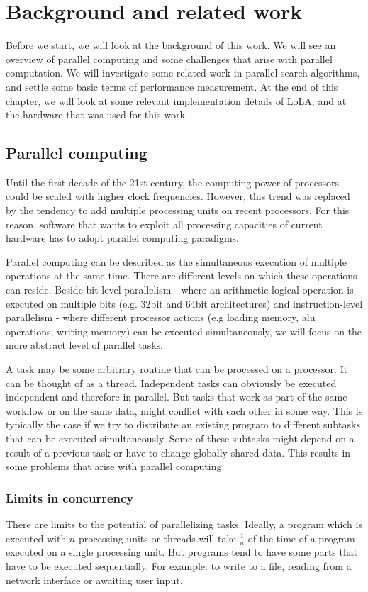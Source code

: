 \chapter{Background and related work}
Before we start, we will look at the background of this work. We will see an overview of parallel computing and some challenges that arise with parallel computation. We will investigate some related work in parallel search algorithms, and settle some basic terms of performance measurement. At the end of this chapter, we will look at some relevant implementation details of LoLA, and at the hardware that was used for this work.

\section{Parallel computing}
Until the first decade of the 21st century, the computing power of processors could be scaled with higher clock frequencies. However, this trend was replaced by the tendency to add multiple processing units on recent processors. For this reason, software that wants to exploit all processing capacities of current hardware has to adopt parallel computing paradigms.

Parallel computing can be described as the simultaneous execution of multiple operations at the same time. There are different levels on which these operations can reside. Beside bit-level parallelism - where an arithmetic logical operation is executed on multiple bits (e.g. 32bit and 64bit architectures) and instruction-level parallelism\cite{wall1991limits} - where different processor actions (e.g loading memory, alu operations, writing memory) can be executed simultaneously, we will focus on the more abstract level of parallel tasks.

A task may be some arbitrary routine that can be processed on a processor. It can be thought of as a thread. Independent tasks can obviously be executed independent and therefore in parallel. But tasks that work as part of the same workflow or on the same data, might conflict with each other in some way. This is typically the case if we try to distribute an existing program to different subtasks that can be executed simultaneously. Some of these subtasks might depend on a result of a previous task or have to change globally shared data. This results in some problems that arise with parallel computing.

\subsection{Limits in concurrency}
There are limits to the potential of parallelizing tasks. Ideally, a program which is executed with $n$ processing units or threads will take $\frac{1}{n}$ of the time of a program executed on a single processing unit. But programs tend to have some parts that have to be executed sequentially. For example: to write to a file, reading from a network interface or awaiting user input.

